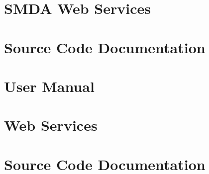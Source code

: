 \appendix


\chapter{SMDA Web Services}
\label{ch:maw_web_services}


\chapter{\mawapp Source Code Documentation}
\label{ch:maw_code_docs}


\chapter{\keggapp User Manual}
\label{ch:kegg_manual}



\chapter{\boldpathcasekegg Web Services}
\label{ch:kegg_web_services}


\chapter{\keggapp Source Code Documentation}
\label{ch:kegg_code_docs}
\singlespace

\doublespace


\singlespace
%
\doublespace






